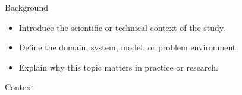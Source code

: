 \begin{frame}{Background}

\begin{itemize}
    \item Introduce the scientific or technical context of the study.
    \item Define the domain, system, model, or problem environment.
    \item Explain why this topic matters in practice or research.
\end{itemize}

\vspace{0.45cm}

\begin{block}{Context}
\end{block}

\end{frame}
